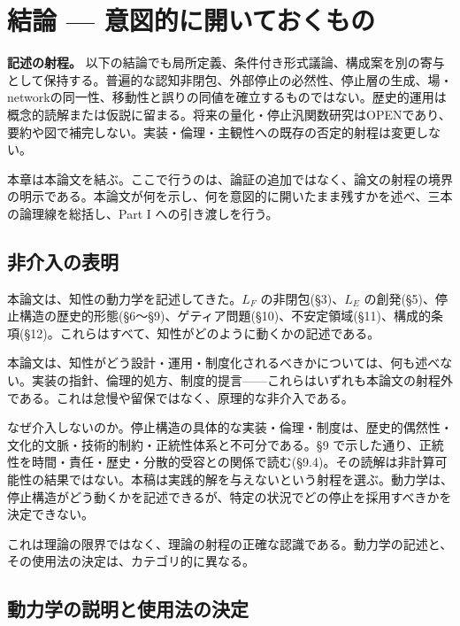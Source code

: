 \section{結論 — 意図的に開いておくもの}

\noindent\textbf{記述の射程。} 以下の結論でも局所定義、条件付き形式議論、構成案を別の寄与として保持する。普遍的な認知非閉包、外部停止の必然性、停止層の生成、場・networkの同一性、移動性と誤りの同値を確立するものではない。歴史的運用は概念的読解または仮説に留まる。将来の量化・停止汎関数研究はOPENであり、要約や図で補完しない。実装・倫理・主観性への既存の否定的射程は変更しない。



本章は本論文を結ぶ。ここで行うのは、論証の追加ではなく、論文の射程の境界の明示である。本論文が何を示し、何を意図的に開いたまま残すかを述べ、三本の論理線を総括し、Part I への引き渡しを行う。

\bigskip


\subsection{非介入の表明}


本論文は、知性の動力学を記述してきた。$L_F$ の非閉包(\S{}3)、$L_E$ の創発(\S{}5)、停止構造の歴史的形態(\S{}6〜\S{}9)、ゲティア問題(\S{}10)、不安定領域(\S{}11)、構成的条項(\S{}12)。これらはすべて、知性がどのように動くかの記述である。

本論文は、知性がどう設計・運用・制度化されるべきかについては、何も述べない。実装の指針、倫理的処方、制度的提言——これらはいずれも本論文の射程外である。これは怠慢や留保ではなく、原理的な非介入である。

なぜ介入しないのか。停止構造の具体的な実装・倫理・制度は、歴史的偶然性・文化的文脈・技術的制約・正統性体系と不可分である。\S{}9 で示した通り、正統性を時間・責任・歴史・分散的受容との関係で読む(\S{}9.4)。その読解は非計算可能性の結果ではない。本稿は実践的解を与えないという射程を選ぶ。動力学は、停止構造がどう動くかを記述できるが、特定の状況でどの停止を採用すべきかを決定できない。

これは理論の限界ではなく、理論の射程の正確な認識である。動力学の記述と、その使用法の決定は、カテゴリ的に異なる。

\bigskip


\subsection{動力学の説明と使用法の決定}


